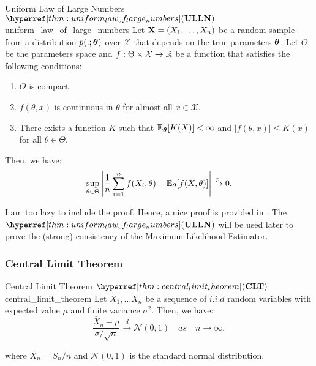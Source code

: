 \begin{theorem}{Uniform Law of Large Numbers $\ULLN$}{uniform_law_of_large_numbers}
    Let ${\bf X}=(X_1, \dots, X_n)$ be a random sample from a distribution $p(.;\boldsymbol{\theta})$ over $\mathcal{X}$ that depends on the true parameters $\boldsymbol{\theta}$. Let $\Theta$ be the parameters space and $f:\Theta\times\mathcal{X}\to\mathbb{R}$ be a function that satisfies the following conditions:
    \begin{enumerate}
        \item $\Theta$ is compact.
        \item $f(\theta, x)$ is continuous in $\theta$ for almost all $x\in\mathcal{X}$.
        \item There exists a function $K$ such that $\mathbb{E}_{\boldsymbol{\theta}}[K(X)]<\infty$ and $|f(\theta, x)|\le K(x)$ for all $\theta\in\Theta$. 
    \end{enumerate} 

    \noindent Then, we have:
    \begin{equation}
        \sup_{\theta\in\Theta}\Bigg| 
            \frac{1}{n}\sum_{i=1}^n f(X_i, \theta) - \mathbb{E}_{\boldsymbol{\theta}}[f(X, \theta)]
         \Bigg| \xrightarrow{p} 0.
    \end{equation}
\end{theorem} 

\begin{proof*}
    I am too lazy to include the proof. Hence, a nice proof is provided in \cite[Theorem 16, Page 111]{book:ferguson1996}. The $\ULLN$ will be used later to prove the (strong) consistency of the Maximum Likelihood Estimator.
\end{proof*} 

\subsubsection{Central Limit Theorem}
\begin{theorem}{Central Limit Theorem $\CLT$}{central_limit_theorem}
    Let $X_1, \dots X_n$ be a sequence of $i.i.d$ random variables with expected value $\mu$ and finite variance $\sigma^2$. Then, we have:
    \begin{equation}
        \frac{\bar X_n - \mu}{\sigma/\sqrt{n}} \xrightarrow{d} \mathcal{N}(0, 1) \quad as \quad n \to \infty,
    \end{equation}

    \noindent where $\bar X_n = S_n/n$ and $\mathcal{N}(0,1)$ is the standard normal distribution.
\end{theorem}

